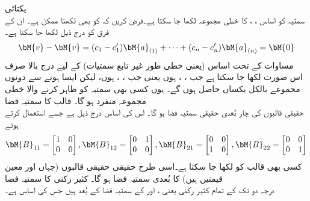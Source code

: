 \quad یکتائی\\
سمتیہ  کو اساس ، ،  کا خطی مجموعہ  لکھا جا سکتا ہے۔فرض کریں کہ  کو  بھی لکھنا ممکن ہے۔ ان کے فرق  کو  درج ذیل لکھا جا سکتا ہے۔
\begin{align*}
\bM{v}-\bM{v}=(c_1-c_1')\bM{a}_{(1)}+\cdots+(c_n-c_n')\bM{a}_{(n)}=\bM{0}
\end{align*} 
مساوات  کے تحت اساس (یعنی خطی طور غیر تابع سمتیات) کے لیے درج بالا صرف اس صورت لکھا جا سکتا ہے جب
 ، ،  ہوں یعنی جب ، ،  ہوں، لیکن ایسا ہونے سے دونوں مجموعے بالکل یکساں حاصل ہوں گے۔ یوں کسی بھی سمتیہ کو ظاہر کرنے والا خطی مجموعہ  منفرد ہو گا۔
\quad قالب کا سمتیہ فضا\\
حقیقی  قالبوں کی چار بُعدی حقیقی سمتیہ فضا ہو گا۔ اس کی اساس درج ذیل ہے جسے استعمال کرتے ہوئے
\begin{align}
\bM{B}_{11}=\begin{bmatrix} 1&0\\0&0 \end{bmatrix}, \bM{B}_{12}=\begin{bmatrix} 0&1\\0&0 \end{bmatrix}, \bM{B}_{21}=\begin{bmatrix} 0&0\\1&0 \end{bmatrix}, \bM{B}_{22}=\begin{bmatrix} 0&0\\0&1 \end{bmatrix}
\end{align}
 کسی بھی  قالب  کو  لکھا جا سکتا ہے۔اسی طرح حقیقی  حقیقی قالبوں (جہاں  اور  معین قیمتیں ہیں) کا  بُعدی سمتیہ فضا ہو گا۔ 
\quad کثیر رکنی کا سمتیہ فضا\\
درجہ دو تک کے تمام کثیر رکنی یعنی ،  اور   کے سمتیہ فضا کے  بُعد  ہیں جس کی اساس  ہے۔

